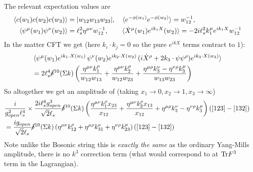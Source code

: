 \documentclass[11pt, class=article, crop=false]{standalone}
\begin{document}
\begin{enumerate}
	The relevant expectation values are
	\[
	\begin{aligned}
		\braket{c(w_1) c(w_2) c(w_3)} &= |w_{12} w_{13} w_{23}|, \quad \braket{e^{-\phi(w_1)} e^{-\phi(w_2)}} = w_{12}^{-1},\\
		\quad \braket{\psi^\mu(w_1) \psi^\nu (w_2)} &= \ell_s^2 \eta^{\mu \nu} w_{12}^{-1}, 
		\qquad \braket{\dot X^\mu(w_1) e^{i k_1 X} (w_2)} = -2 i \ell_s^2 k_1^\mu e^{i k_1 X} w_{12}^{-1} 
	\end{aligned}
	\]
	In the matter CFT we get (here $k_i \cdot k_j = 0$ so the pure $e^{i k X}$ terms contract to $1$):
	\[
	\begin{aligned}
		&\braket{\psi^\mu (w_1) e^{i k_1 \cdot X(w_1)}\, \psi^\nu (w_2) e^{i k_2 \cdot X(w_2)} \, (i \dot X^\rho + 2 k_3 \cdot \psi \psi^\rho) e^{i k_3 \cdot X(w_3)} } \\
		&= 2 \ell_s^4 \cancel\delta^{10}(\Sigma k) \left(\frac{\eta^{\mu \nu}k_1^\rho}{w_{12} w_{13}} + \frac{\eta^{\mu \nu} k_2^\rho}{w_{12} w_{23}} + \frac{\eta^{\mu \rho} k_3^\nu - \eta^{\nu \rho} k_3^\mu}{w_{13} w_{23}} \right)
	\end{aligned}
	\]
	So altogether we get an amplitude of (taking $x_1 \to 0, x_2 \to 1, x_3 \to \infty$)
	\[
	\begin{aligned}
		& \frac{i}{g_{open}^2 \ell_s^4} \times \frac{2 i \ell_s^4 g_{open}^3}{\sqrt 2 \ell_s} \cancel\delta^{10}(\Sigma k) \left(\frac{\eta^{\mu \nu}k_1^\rho x_{23}}{x_{12}} + \frac{\eta^{\mu \nu} k_2^\rho x_{13}}{x_{12}} + \eta^{\mu \rho} k_3^\nu - \eta^{\nu \rho} k_3^\mu \right) ([123] - [132])
		\\ &= 
		\frac{i g_{open}}{\sqrt 2 \ell_s} \cancel\delta^{10}(\Sigma k)  \left(\eta^{\mu \nu} k_{12}^\rho + \eta^{\mu \rho} k_{31}^\nu + \eta^{\nu \rho} k_{23}^\mu \right) ([123] - [132])
	\end{aligned}
	\]
	Note unlike the Bosonic string this is \emph{exactly the same} as the ordinary Yang-Mills amplitude, there is no $k^3$ correction term (what would correspond to at $\mathrm{Tr} F^3$ term in the Lagrangian).
	

\end{enumerate}
\end{document}
